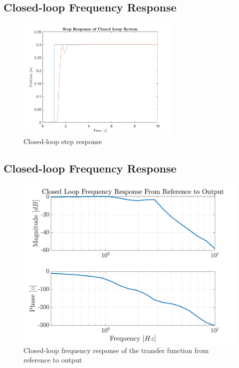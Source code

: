 \documentclass[11pt]{article}
\begin{document}
\subsection{Closed-loop Frequency Response}


\begin{figure}[!ht]
\centering
\includegraphics[width=0.7\textwidth]{CLStepResponse.png}
\caption{Closed-loop step response}
\label{fig:CLStepResponse}
\end{figure}

\subsection{Closed-loop Frequency Response}



\begin{figure}[!ht]
\centering
\includegraphics[width=\textwidth]{CLFreqResp.png}
\caption{Closed-loop frequency response of the transfer function from reference to output}
\label{fig:CLFreqResponse}
\end{figure}
\end{document}
